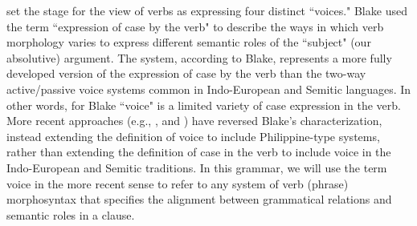 \citet{blake1906} set the stage for the view of  verbs as expressing four distinct “voices." Blake used the term “expression of case by the verb" to describe the ways in which verb morphology varies to express different semantic roles of the “subject" (our absolutive) argument. The  system, according to Blake, represents a more fully developed version of the expression of case by the verb than the two-way active/passive voice systems common in Indo-European and Semitic languages. In other words, for Blake “voice" is a limited variety of case expression in the verb. More recent approaches (e.g., \citealt{wolff1967, payne1994, foley2008}, and \citealt{himmelmann2008}) have reversed Blake's characterization, instead extending the definition of voice to include Philippine-type systems, rather than extending the definition of case in the verb to include voice in the Indo-European and Semitic traditions. In this grammar, we will use the term voice in the more recent sense to refer to any system of verb (phrase) morphosyntax that specifies the alignment between grammatical relations and semantic roles in a clause.


